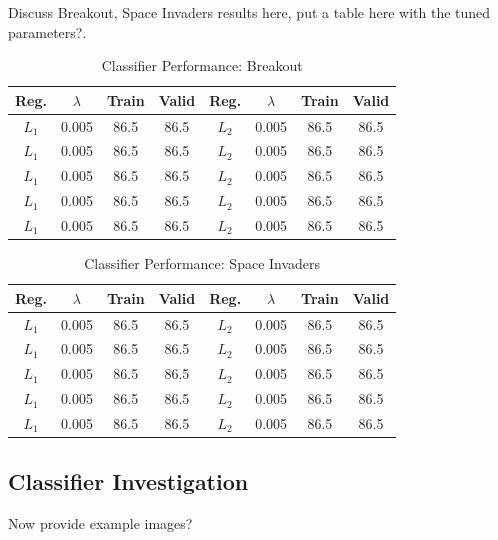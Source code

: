 \documentclass[letterpaper, 10pt, conference]{ieeeconf}
\begin{document}
Discuss Breakout, Space Invaders results here, put a table here with the tuned
parameters?.

\begin{table}[!t]
\renewcommand{\arraystretch}{1.3}
\caption{Classifier Performance: Breakout}
\label{tab:breakout}
\centering
\begin{tabular}{c c c c | c c c c}
\hline
Reg. & $\lambda$ & Train & Valid & Reg. & $\lambda$ & Train & Valid \\
\hline
$L_1$ & 0.005 & 86.5 & 86.5 & $L_2$ & 0.005 & 86.5 & 86.5 \\
$L_1$ & 0.005 & 86.5 & 86.5 & $L_2$ & 0.005 & 86.5 & 86.5 \\
$L_1$ & 0.005 & 86.5 & 86.5 & $L_2$ & 0.005 & 86.5 & 86.5 \\
$L_1$ & 0.005 & 86.5 & 86.5 & $L_2$ & 0.005 & 86.5 & 86.5 \\
$L_1$ & 0.005 & 86.5 & 86.5 & $L_2$ & 0.005 & 86.5 & 86.5 \\
\hline
\end{tabular}
\end{table}

\begin{table}[!t]
\renewcommand{\arraystretch}{1.3}
\caption{Classifier Performance: Space Invaders}
\label{tab:space_invaders}
\centering
\begin{tabular}{c c c c | c c c c}
\hline
Reg. & $\lambda$ & Train & Valid & Reg. & $\lambda$ & Train & Valid \\
\hline
$L_1$ & 0.005 & 86.5 & 86.5 & $L_2$ & 0.005 & 86.5 & 86.5 \\
$L_1$ & 0.005 & 86.5 & 86.5 & $L_2$ & 0.005 & 86.5 & 86.5 \\
$L_1$ & 0.005 & 86.5 & 86.5 & $L_2$ & 0.005 & 86.5 & 86.5 \\
$L_1$ & 0.005 & 86.5 & 86.5 & $L_2$ & 0.005 & 86.5 & 86.5 \\
$L_1$ & 0.005 & 86.5 & 86.5 & $L_2$ & 0.005 & 86.5 & 86.5 \\
\hline
\end{tabular}
\end{table}

\subsection{Classifier Investigation}

Now provide example images?
\end{document}
